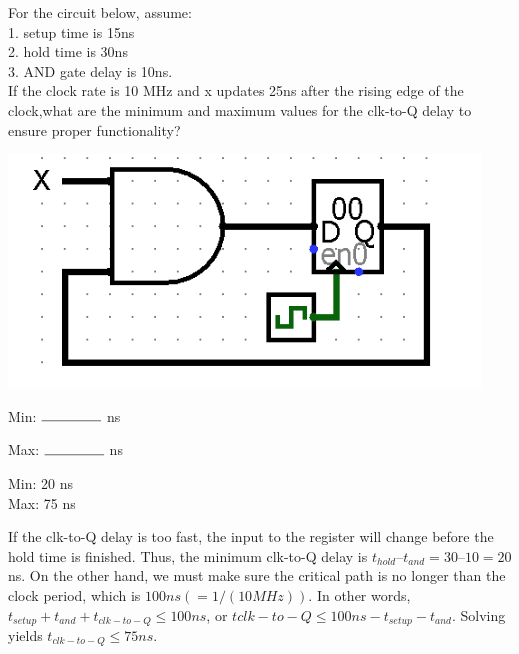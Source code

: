 \begin{blocksection}
For the circuit below, assume: \\
    1. setup time is 15ns \\
    2. hold time is 30ns \\
    3. AND gate delay is 10ns.  \\
If the clock rate is 10 MHz and x updates 25ns after the rising edge of the clock,what are the minimum and maximum values for the clk-to-Q delay to ensure proper functionality?
    
\includegraphics[width=\textwidth]{images/sds/holdtime.png}

\item Min: $\rule{1.5cm}{0.15mm}$ ns
\item Max: $\rule{1.5cm}{0.15mm}$ ns

\begin{solution} 
Min: 20 ns \\
Max: 75 ns

If the clk-to-Q delay is too fast, the input to the register will change before the hold time is finished.
Thus, the minimum clk-to-Q delay is $t_{hold} – t_{and} = 30 – 10 = 20$ ns.
On the other hand, we must make sure the critical path is no longer than the clock period, which is $100 ns (= 1/(10 MHz))$. 
In other words, $t_{setup} + t_{and} + t_{clk-to-Q} \leq 100ns$, or $tclk-to-Q \leq 100ns - t_{setup} - t_{and}$. Solving yields $t_{clk-to-Q} \leq 75 ns$.
    
\end{solution}
    
\end{blocksection}